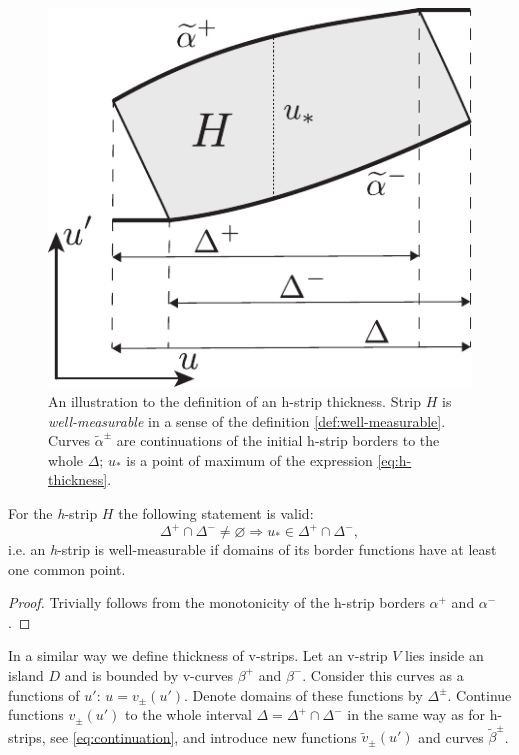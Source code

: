 \begin{figure}[h]
\centering
	\includegraphics[scale = 1]{pic/thickness definition}
	\caption{An illustration to the definition of an h-strip thickness. Strip $H$ is {\it well-measurable} in a sense of the definition \ref{def:well-measurable}. Curves $\widetilde{\alpha}^{\pm}$ are continuations of the initial h-strip borders to the whole $\Delta$; $u_*$ is a point of maximum of the expression \eqref{eq:h-thickness}.}
\label{fig:thickness-definition}
\end{figure}

\begin{proposition}
	For the \emph{h}-strip $H$ the following statement is valid:
	\begin{equation}
		\Delta^+ \cap \Delta^- \neq \varnothing \Rightarrow u_* \in \Delta^+ \cap \Delta^-,
	\end{equation}
	i.e. an \emph{h}-strip is well-measurable if domains of its border functions have at least one common point.
\end{proposition}
\begin{proof}
	Trivially follows from the monotonicity of the h-strip borders $\alpha^+$ and $\alpha^-$.
\end{proof}

In a similar way we define thickness of v-strips.
Let an v-strip $V$ lies inside an island $D$ and is bounded by v-curves $\beta^+$ and $\beta^-$.
Consider this curves as a functions of $u'$: $u = v_{\pm}(u')$.
Denote domains of these functions by $\Delta^{\pm}$.
Continue functions $v_{\pm}(u')$ to the whole interval $\Delta = \Delta^+ \cap \Delta^-$ in the same way as for h-strips, see \eqref{eq:continuation}, and introduce new functions $\widetilde{v}_{\pm}(u')$ and curves $\widetilde{\beta}^{\pm}$.

